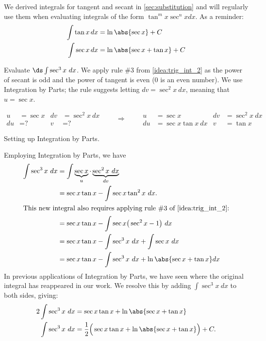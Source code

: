 We derived integrals for tangent and secant in \autoref{sec:substitution} and will regularly use them when evaluating integrals of the form $\tan^m x \sec^n x dx$.  As a reminder:
\begin{align*}
 \int\tan x\,dx &=\ln\abs{\sec x}+C \\
 \int\sec x\,dx &=\ln\abs{\sec x+\tan x}+C
\end{align*}

\begin{example}\label{ex_trigint6}
Evaluate $\ds\int \sec^3x\ dx$.
\solution
We apply rule \#3 from \autoref{idea:trig_int_2} as the power of secant is odd and the power of tangent is even (0 is an even number). We use Integration by Parts; the rule suggests letting $dv = \sec^2x\ dx$, meaning that $u = \sec x$. \\
\noindent\begin{minipage}[t]{\linewidth}\noindent%
\captionsetup{type=figure}%
\[
\begin{aligned}
u&= \sec x & dv&=\sec^2 x\ dx\\
du&= \text{?} & v&=\text{?}
\end{aligned}
\qquad\Rightarrow\qquad
\begin{aligned}
u&= \sec x & dv&=\sec^2 x\ dx\\
du&= \sec x\tan x\ dx & v&=\tan x
\end{aligned}
\]
\caption{Setting up Integration by Parts.}\label{fig:trigint1}
\end{minipage}

Employing Integration by Parts, we have
\begin{align*}
\int \sec^3x\ dx
 	&=	\int \underbrace{\sec x}_u\cdot\underbrace{\sec^2 x\ dx}_{dv}\\
	&=	\sec x\tan x - \int \sec x\tan^2x\ dx. \\
\intertext{This new integral also requires applying rule \#3 of \autoref{idea:trig_int_2}:}
	&= \sec x\tan x - \int \sec x \big(\sec^2 x-1\big)\ dx\\
	&=	\sec x\tan x - \int \sec^3x\ dx + \int \sec x\ dx \\
	&= \sec x\tan x -\int \sec^3x\ dx + \ln\abs{\sec x+\tan x}dx
\end{align*}
In previous applications of Integration by Parts, we have seen where the original integral has reappeared in our work. We resolve this by adding $\int \sec^3x\ dx$ to both sides, giving:
\begin{align*}
2\int \sec^3x\ dx &= \sec x\tan x + \ln\abs{\sec x+\tan x} \\
\int \sec^3x\ dx &= \frac12\Big(\sec x\tan x + \ln\abs{\sec x+\tan x}\Big)+C.
\end{align*}
\end{example}

